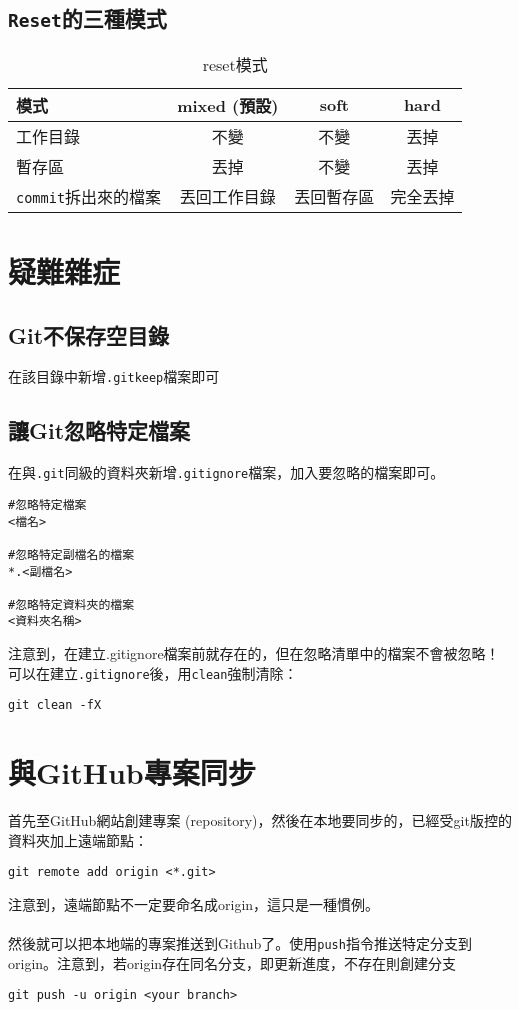 \documentclass{article}
\newcommand{\code}[1]{\texttt{#1}}
\begin{document}
\subsection{\code{Reset}的三種模式}
\begin{table}[h]
	\centering
	\begin{tabular}{|l|c|c|c|}
		\hline
		模式 & mixed (預設) & soft & hard \\
		\hline
		工作目錄 & 不變 & 不變 & 丟掉 \\
		\hline
		暫存區 & 丟掉 & 不變 & 丟掉 \\
		\hline
		\code{commit}拆出來的檔案 & 丟回工作目錄 & 丟回暫存區 & 完全丟掉 \\
		\hline
	\end{tabular}
	\caption{reset模式}
\end{table}


\section{疑難雜症}

\subsection{Git不保存空目錄}
在該目錄中新增\code{.gitkeep}檔案即可

\subsection{讓Git忽略特定檔案}
在與\code{.git}同級的資料夾新增\code{.gitignore}檔案，加入要忽略的檔案即可。
\begin{lstlisting}[language=git]
#忽略特定檔案
<檔名>

#忽略特定副檔名的檔案
*.<副檔名>

#忽略特定資料夾的檔案
<資料夾名稱>
\end{lstlisting}
注意到，在建立.gitignore檔案前就存在的，但在忽略清單中的檔案不會被忽略！可以在建立\code{.gitignore}後，用\code{clean}強制清除：
\begin{lstlisting}[language=git]
git clean -fX
\end{lstlisting}

\section{與GitHub專案同步}
首先至GitHub網站創建專案 (repository)，然後在本地要同步的，已經受git版控的資料夾加上遠端節點：
\begin{lstlisting}[language=git]
git remote add origin <*.git>
\end{lstlisting}
注意到，遠端節點不一定要命名成origin，這只是一種慣例。
\\\\
然後就可以把本地端的專案推送到Github了。使用\texttt{push}指令推送特定分支到origin。注意到，若origin存在同名分支，即更新進度，不存在則創建分支
\begin{lstlisting}[language=git]
git push -u origin <your branch>
\end{lstlisting}
\end{document}
